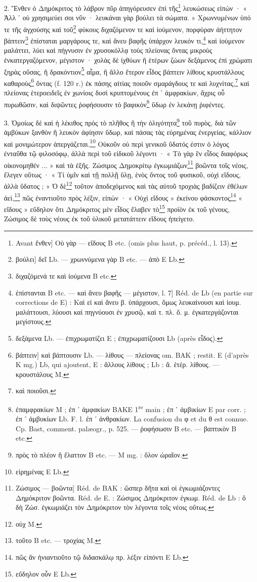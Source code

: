 \documentclass[a4paper, 11pt, oneside, polutonikogreek, french]{article}
\begin{document}
2. Ἔνθεν ὁ Δημόκριτος τὸ λάβρον πῦρ ἀπηγόρευσεν ἐπὶ τῆς\footnote{Avant ἔνθεν] Οὐ γὰρ --- εἴδους B etc. (omis plus haut, p. précéd., l. 13).} λευκώσεως εἰπών · « Ἀλλ ᾽ οὐ χρησιμεύει σοι νῦν · λευκάναι γὰρ βούλει τὰ σώματα. » Χρωννυμένων ὑπό τε τῆς ἀγχούσης καὶ τοῦ\footnote{βούλει] δεῖ Lb. --- χρωννύμενα γὰρ B etc. --- ἀπὸ E Lb.} φύκους διχαζόμενον τε καὶ ἰούμενον, πορφύραν ἀήττητον βάπτειν\footnote{διχαζόμενά τε καὶ ἰούμενα B etc.} ἐπίσταται μαργάρους τε, καὶ ἄνευ βαφῆς ὑπάρχον λευκόν τι,\footnote{ἐπίστανται B etc. --- καὶ ἄνευ βαφῆς --- μέγιστον, l. 7] Réd. de Lb (en partie sur corrections de E) : Καὶ εἰ καὶ ἄνευ β. ὑπάρχουσι, ὅμως λευκαίνουσι καὶ ἰουμ. μαλάττουσι, λύουσι καὶ πηγνύουσι ἐν χρυσῷ, καὶ τ. πλ. ὄ. μ. ἐγκατεργάζονται μεγίστους.} καὶ ἰούμενον μαλάττει, λύει καὶ πήγνυσιν ἐν χρυσοκόλλᾳ τοὺς πλείονας ὄντας μικροὺς ἐνκατεργαζόμενον, μέγιστον · χολὰς δὲ ἰχθύων ἢ ἑτέρων ζώων δεξάμενος ἐπὶ χρώματι ξηρὰς οὔσας, ἢ δρακόντιον\footnote{δεξάμενα Lb. --- ἐπιχρωματίζει E ; ἐπιχρωματίζουσι Lb (après εἶδος).} αἷμα, ἢ ἄλλο ἕτερον εἶδος βάπτειν λίθους κρυστάλλους καθαροὺς\footnote{βάπτειν] καὶ βάπτουσιν Lb. --- λίθους --- πλείονας om. BAK ; restit. E (d'après K mg.) Lb, qui ajoutent, E : ἄλλους λίθους ; Lb : ἄ. ἑτέρ. λίθους. --- κρουστάλους M.} ὄντας (f. 120 r.) ἐκ πάσης αἰτίας ποιοῦν σμαράγδους τε καὶ λυχνίτας,\footnote{καὶ ποιοῦσι.} καὶ πλείονας ἑτεροειδεῖς ἐν χωνίοις δυσὶ κρυπτομένους ἐπ ᾽ ἀμφρακίων, ἄχρις οὗ πυρωθῶσιν, καὶ διψῶντες ῥοφήσουσιν τὸ βαφικὸν\footnote{ἐπαμφρακίων M ; ἐπ ᾽ ἀμφακίων BAKE 1\textsuperscript{re} main ; ἐπ ᾽ ἀμβικίων E par corr. ; ἐπ ᾽ ἀμβυκίων Lb. F. l. ἐπ ᾽ ἀνθρακίων. La confusion du φ et du θ est connue. Cp. Bast, comment. palæogr., p. 525. --- ῥοφήσωσιν B etc. --- βαπτικὸν B etc.} ὕδωρ ἐν λεκάνῃ ῥιφέντες.

3. Ὁμοίως δὲ καὶ ἡ λέκιθος πρὸς τὸ πλῆθος ἢ τὴν ὀλιγότητα\footnote{πρὸς τὸ πλέον ἢ ἔλαττον B etc. --- M mg. : ὅλον ὡραῖον.} τοῦ πυρὸς, διὰ τῶν ἀμβύκων ξανθὸν ἢ λευκὸν ἀφίησιν ὕδωρ, καὶ πάσας τὰς εὑρημένας ἐνεργείας, κάλλιον καὶ μονιμώτερον ἀπεργάζεται.\footnote{εἰρημένας E Lb.} Οὐκοῦν οὐ περὶ γενικοῦ ὕδατός ἐστιν ὁ λόγος ἐνταῦθα τῷ φιλοσόφῳ, ἀλλὰ περὶ τοῦ εἰδικοῦ λέγοντι · « Τὸ γὰρ ἓν εἶδος διαφόρως οἰκονομηθέν ... » καὶ τὰ ἑξῆς. Ζώσιμος Δημοκρίτῳ ἐγκωμιάζων\footnote{Zώσιμος --- βοῶντα] Réd. de BAK : ὥσπερ δῆτα καὶ οἱ ἐγκωμιάζοντες Δημόκριτον βοῶντα. Réd. de E. : Ζώσιμος Δημόκριτον ἐγκωμ. Réd. de Lb : ὃ δὴ Ζώσ. ἐγκωμιάζει τὸν Δημόκριτον τὸν λέγοντα τοῖς νέοις οὕτως.} βοῶντα τοῖς νέοις, ἔλεγεν οὕτως · « Τί ὑμῖν καὶ τῇ πολλῇ ὕλῃ, ἑνὸς ὄντος τοῦ φυσικοῦ, οὐχὶ εἴδους, ἀλλὰ ὕδατος ; » Ὁ δὲ\footnote{οὐχ M.} τοῦτον ἀποδεχόμενος καὶ τὰς αὐτοῦ τροχιὰς βαδίζειν ἐθέλων ἀεὶ,\footnote{τοῦτο B etc. --- τροχίας M.} πῶς ἐναντιοῦτο πρὸς λέξιν, εἰπών · « Οὐχὶ εἴδους » ἐκείνου φάσκοντος\footnote{πῶς ἂν ἠνιαντιοῦτο τῷ διδασκάλῳ πρ. λέξιν εἰπόντι E Lb.} « εἴδους » εὔδηλον ὅτι Δημόκριτος μὲν εἶδος ἔλαβεν τὸ\footnote{εὔδηλον οὖν E Lb.} προϊὸν ἐκ τοῦ γένους, Ζώσιμος δὲ τοὺς νέους ἐκ τοῦ ὑλικοῦ μετατάττειν εἴδους ἠπείγετο.
\end{document}
